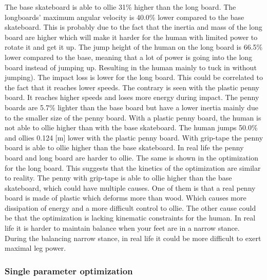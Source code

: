 \documentclass[default,iicol]{sn-jnl}
\begin{document}
The base skateboard is able to ollie 31\% higher than the long board. The longboards' maximum angular velocity is 40.0\% lower compared to the base skateboard. This is probably due to the fact that the inertia and mass of the long board are higher which will make it harder for the human with limited power to rotate it and get it up. The jump height of the human on the long board is 66.5\% lower compared to the base, meaning that a lot of power is going into the long board instead of jumping up. Resulting in the human mainly to tuck in without jumping). The impact loss is lower for the long board. This could be correlated to the fact that it reaches lower speeds. The contrary is seen with the plastic penny board. It reaches higher speeds and loses more energy during impact. The penny boards are 5.7\% lighter than the base board but have a lower inertia mainly due to the smaller size of the penny board. With a plastic penny board, the human is not able to ollie higher than with the base skateboard. The human jumps 50.0\% and ollies 0.124 [m] lower with the plastic penny board. With grip-tape the penny board is able to ollie higher than the base skateboard. In real life the penny board and long board are harder to ollie. The same is shown in the optimization for the long board. This suggests that the kinetics of the optimization are similar to reality. The penny with grip-tape is able to ollie higher than the base skateboard, which could have multiple causes. One of them is that a real penny board is made of plastic which deforms more than wood. Which causes more dissipation of energy and a more difficult control to ollie. The other cause could be that the optimization is lacking kinematic constraints for the human. In real life it is harder to maintain balance when your feet are in a narrow stance. During the balancing narrow stance, in real life it could be more difficult to exert maximal leg power.

\subsubsection{Single parameter optimization}
\end{document}
